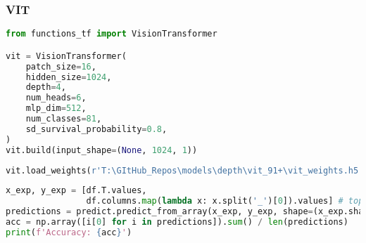 \hypertarget{vit}{%
\subsubsection*{VIT}\label{vit}}

\begin{lstlisting}[language=Python]
from functions_tf import VisionTransformer

vit = VisionTransformer(
    patch_size=16,
    hidden_size=1024,
    depth=4,
    num_heads=6,
    mlp_dim=512,
    num_classes=81,
    sd_survival_probability=0.8,
)
vit.build(input_shape=(None, 1024, 1))
\end{lstlisting}

\begin{lstlisting}[language=Python]
vit.load_weights(r'T:\GItHub_Repos\models\depth\vit_91+\vit_weights.h5')
\end{lstlisting}

\begin{lstlisting}[language=Python]
x_exp, y_exp = [df.T.values,
                df.columns.map(lambda x: x.split('_')[0]).values] # top layer
predictions = predict.predict_from_array(x_exp, y_exp, shape=(x_exp.shape[0], 1024,1), model=vit)
acc = np.array([i[0] for i in predictions]).sum() / len(predictions)
print(f'Accuracy: {acc}')
\end{lstlisting}
